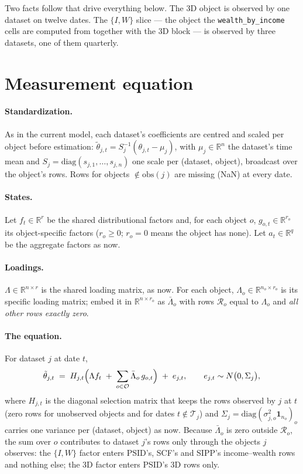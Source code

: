 \documentclass[11pt]{article}
\newcommand{\code}[1]{\texttt{#1}}
\newcommand{\obs}{\mathrm{obs}}
\newcommand{\diag}{\mathrm{diag}}
\newcommand{\R}{\mathbb{R}}
\begin{document}
Two facts follow that drive everything below. The 3D object is observed by one
dataset on twelve dates. The $\{I,W\}$ slice --- the object the
\code{wealth\_by\_income} cells are computed from together with the 3D block ---
is observed by three datasets, one of them quarterly.

\section{Measurement equation}\label{sec:measurement}

\paragraph{Standardization.} As in the current model, each dataset's
coefficients are centred and scaled per object before estimation:
$\tilde\theta_{j,t} = S_j^{-1}(\theta_{j,t} - \mu_j)$, with $\mu_j \in \R^n$
the dataset's time mean and $S_j = \diag(s_{j,1},\ldots,s_{j,n})$ one scale per
(dataset, object), broadcast over the object's rows. Rows for objects
$\notin \obs(j)$ are missing (NaN) at every date.

\paragraph{States.} Let $f_t \in \R^{r}$ be the shared distributional factors
and, for each object $o$, $g_{o,t} \in \R^{r_o}$ its object-specific factors
($r_o \ge 0$; $r_o = 0$ means the object has none). Let $a_t \in \R^{q}$ be the
aggregate factors as now.

\paragraph{Loadings.} $\Lambda \in \R^{n\times r}$ is the shared loading matrix,
as now. For each object, $\Lambda_o \in \R^{n_o\times r_o}$ is its specific
loading matrix; embed it in $\R^{n\times r_o}$ as $\bar\Lambda_o$ with rows
$\mathcal{R}_o$ equal to $\Lambda_o$ and \emph{all other rows exactly zero}.

\paragraph{The equation.} For dataset $j$ at date $t$,
\begin{equation}
  \tilde\theta_{j,t}
  \;=\; H_{j,t}\Bigl( \Lambda f_t \;+\; \sum_{o\in\mathcal{O}} \bar\Lambda_o\, g_{o,t} \Bigr) \;+\; e_{j,t},
  \qquad e_{j,t}\sim N\bigl(0, \Sigma_j\bigr),
  \label{eq:meas}
\end{equation}
where $H_{j,t}$ is the diagonal selection matrix that keeps the rows observed by
$j$ at $t$ (zero rows for unobserved objects and for dates $t\notin\mathcal{T}_j$)
and $\Sigma_j = \diag(\sigma^2_{j,o}\mathbf{1}_{n_o})_{o}$ carries one variance
per (dataset, object) as now. Because $\bar\Lambda_o$ is zero outside
$\mathcal{R}_o$, the sum over $o$ contributes to dataset $j$'s rows only through
the objects $j$ observes: the $\{I,W\}$ factor enters PSID's, SCF's and SIPP's
income--wealth rows and nothing else; the 3D factor enters PSID's 3D rows only.
\end{document}
